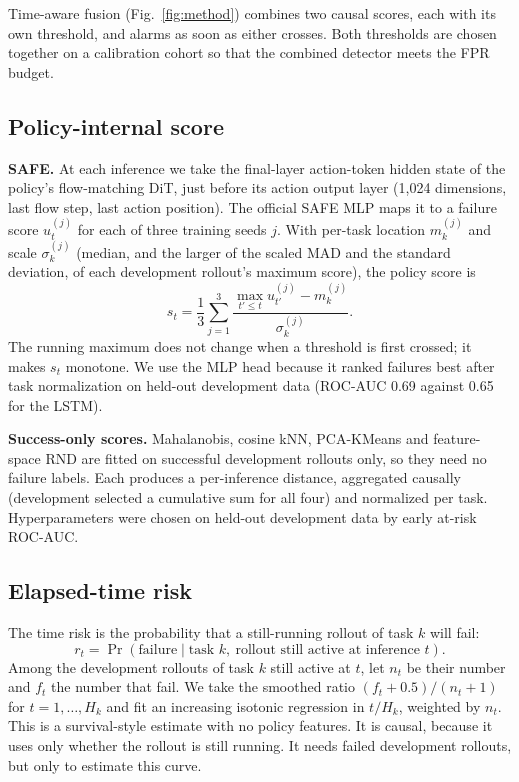 \documentclass[conference,a4paper]{IEEEtran}
\begin{document}
Time-aware fusion (Fig.~\ref{fig:method}) combines two causal scores, each with its own
threshold, and alarms as soon as either crosses. Both thresholds are chosen together on a calibration cohort so that
the combined detector meets the FPR budget.

\subsection{Policy-internal score}

\textbf{SAFE.} At each inference we take the final-layer action-token hidden state of the
policy's flow-matching DiT, just before its action output layer (1,024 dimensions, last
flow step, last action position). The official SAFE MLP maps it to a failure score
$u^{(j)}_t$ for each of three training seeds $j$. With per-task location $m^{(j)}_k$ and
scale $\sigma^{(j)}_k$ (median, and the larger of the scaled MAD and the standard deviation,
of each development rollout's maximum score), the policy score is
\begin{equation}
  s_t = \frac{1}{3}\sum_{j=1}^{3} \frac{\max_{t' \le t} u^{(j)}_{t'} - m^{(j)}_k}{\sigma^{(j)}_k}.
\end{equation}
The running maximum does not change when a threshold is first crossed; it makes $s_t$
monotone. We use the MLP head because it ranked failures best after task normalization on
held-out development data (ROC-AUC 0.69 against 0.65 for the LSTM).

\textbf{Success-only scores.} Mahalanobis, cosine kNN, PCA-KMeans and feature-space RND
are fitted on successful development rollouts only, so they need no failure labels. Each
produces a per-inference distance, aggregated causally (development selected a cumulative
sum for all four) and normalized per task. Hyperparameters were chosen on held-out
development data by early at-risk ROC-AUC.

\subsection{Elapsed-time risk}

The time risk is the probability that a still-running rollout of task $k$ will fail:
\begin{equation}
  r_t = \Pr(\text{failure} \mid \text{task } k,\ \text{rollout still active at inference } t).
\end{equation}
Among the development rollouts of task $k$ still active at $t$, let $n_t$ be their number
and $f_t$ the number that fail. We take the smoothed ratio $(f_t + 0.5)/(n_t + 1)$ for
$t = 1, \dots, H_k$ and fit an increasing isotonic regression in $t/H_k$, weighted by
$n_t$. This is a survival-style estimate with no policy features. It is causal, because it
uses only whether the rollout is still running. It needs failed development rollouts, but
only to estimate this curve.
\end{document}
